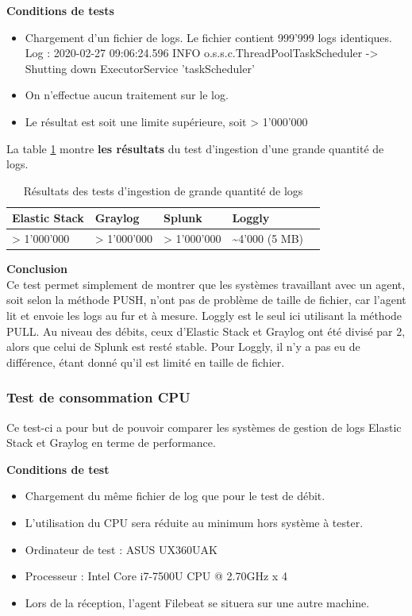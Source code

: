 \documentclass[paper=a4, fontsize=11pt]{scrartcl}
\begin{document}
\textbf{Conditions de tests} \\
\begin{itemize}
    \item Chargement d'un fichier de logs.
    \subitem Le fichier contient 999'999 logs identiques.
    \subitem Log : 2020-02-27 09:06:24.596 INFO o.s.s.c.ThreadPoolTaskScheduler -> Shutting down ExecutorService ’taskScheduler’
    \item On n'effectue aucun traitement sur le log.
    \item Le résultat est soit une limite supérieure, soit \og > 1'000'000 \fg
\end{itemize}

La table \ref{t-testGrandeIngestion} montre \textbf{les résultats} du test d'ingestion d'une grande quantité de logs.

\centering
\begin{table}[H]
\centering
\begin{tabular}{ |p{3cm}|p{3cm}|p{3cm}|p{3cm}|p{3cm}|  }
    \hline
    Elastic Stack & Graylog & Splunk & Loggly \\
    \hline
    > 1'000'000 & > 1'000'000 & > 1'000'000 & \textasciitilde 4'000 (5 MB) \\
    \hline
\end{tabular}
\caption{Résultats des tests d'ingestion de grande quantité de logs}
\label{t-testGrandeIngestion}
\end{table}
\justify

\textbf{Conclusion} \\
Ce test permet simplement de montrer que les systèmes travaillant avec un agent, soit selon la méthode PUSH, n'ont pas de problème de taille de fichier, car l'agent lit et envoie les logs au fur et à mesure. Loggly est le seul ici utilisant la méthode PULL. Au niveau des débits, ceux d'Elastic Stack et Graylog ont été divisé par 2, alors que celui de Splunk est resté stable. Pour Loggly, il n'y a pas eu de différence, étant donné qu'il est limité en taille de fichier.


\subsubsection{Test de consommation CPU}

Ce test-ci a pour but de pouvoir comparer les systèmes de gestion de logs Elastic Stack et Graylog en terme de performance.

\textbf{Conditions de test} \\
\begin{itemize}
    \item Chargement du même fichier de log que pour le test de débit.
    \item L'utilisation du CPU sera réduite au minimum hors système à tester.
    \item Ordinateur de test : ASUS UX360UAK
    \item Processeur : Intel Core i7-7500U CPU @ 2.70GHz x 4
    \item Lors de la réception, l'agent Filebeat se situera sur une autre machine.
\end{itemize}
\end{document}
